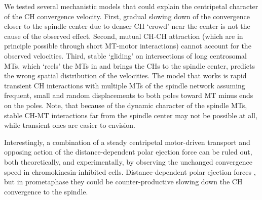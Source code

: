 \documentclass[times, twoside,onecolumn]{zHenriquesLab-StyleBioRxiv}
\begin{document}
We tested several mechanistic models that could explain the centripetal character of the CH convergence velocity. First, gradual slowing down of the convergence closer to the spindle center due to denser CH `crowd’ near the center is not the cause of the observed effect. Second, mutual CH-CH attraction (which are in principle possible \cite{maassInterchromosomalInteractionsGenomic2019,bradyChromosomeInteractionDistance2015} through short MT-motor interactions) cannot account for the observed velocities. Third, stable `gliding’ on intersections of long centrosomal MTs, which `reels’ the MTs in and brings the CHs to the spindle center, predicts the wrong spatial distribution of the velocities. The model that works is rapid transient CH interactions with multiple MTs of the spindle network assuming frequent, small and random displacements to both poles toward MT minus ends on the poles. Note, that because of the dynamic character of the spindle MTs, stable CH-MT interactions far from the spindle center may not be possible at all, while transient ones are easier to envision.

Interestingly, a combination of a steady centripetal motor-driven transport and opposing action of the distance-dependent polar ejection force can be ruled out, both theoretically, and experimentally, by observing the unchanged convergence speed in chromokinesin-inhibited cells. Distance-dependent polar ejection forces \cite{riederMotileKinetochoresPolar1994,tokai-nishizumiChromokinesinKidRequired2005}, but in prometaphase they could be counter-productive slowing down the CH convergence to the spindle. 
\end{document}
